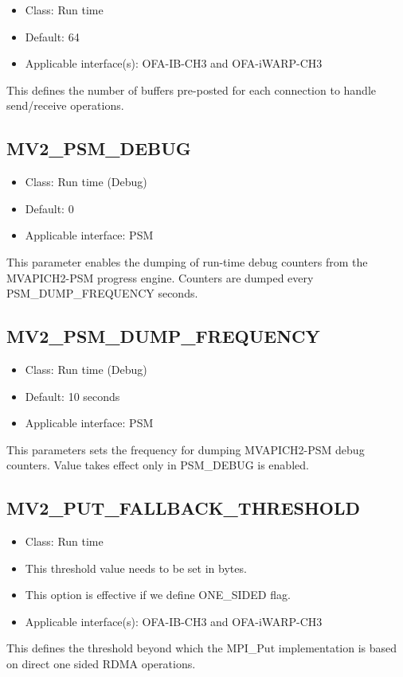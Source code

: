 \begin{itemize}
    \item Class: Run time

    \item Default: 64
    \item Applicable interface(s): OFA-IB-CH3 and OFA-iWARP-CH3
\end{itemize}

This defines the number of buffers pre-posted for each connection to
handle send/receive operations.

\subsection{MV2\_PSM\_DEBUG}
\label{def:psm-debug}

\begin{itemize}
        \item Class: Run time (Debug)
        \item Default: 0
    \item Applicable interface: PSM
\end{itemize}

This parameter enables the dumping of run-time debug counters from the
MVAPICH2-PSM progress engine. Counters are dumped every PSM\_DUMP\_FREQUENCY
seconds.

\subsection{MV2\_PSM\_DUMP\_FREQUENCY}
\label{def:psm-dump}

\begin{itemize}
        \item Class: Run time (Debug)
        \item Default: 10 seconds
    \item Applicable interface: PSM
\end{itemize}

This parameters sets the frequency for dumping MVAPICH2-PSM debug counters.
Value takes effect only in PSM\_DEBUG is enabled.

\subsection{MV2\_PUT\_FALLBACK\_THRESHOLD}
\begin{itemize}
        \item Class: Run time
        \item This threshold value needs to be set in bytes.
        \item This option is effective if we define ONE\_SIDED flag.
    \item Applicable interface(s): OFA-IB-CH3 and OFA-iWARP-CH3

\end{itemize}
This defines the threshold beyond which the MPI\_Put implementation is based on
direct one sided RDMA operations.

